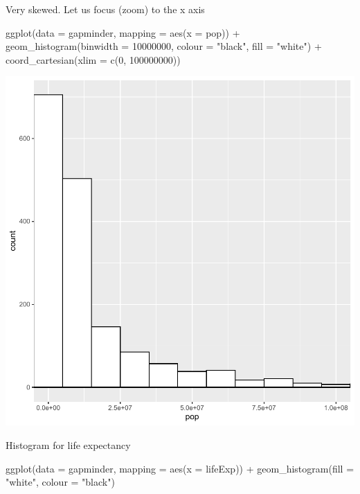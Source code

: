\documentclass[
]{book}
\makeatletter
\newenvironment{Shaded}{\begin{snugshade}}{\end{snugshade}}
\newcommand{\AttributeTok}[1]{\textcolor[rgb]{0.61,0.61,0.61}{#1}}
\newcommand{\DecValTok}[1]{\textcolor[rgb]{0.06,0.06,0.06}{#1}}
\newcommand{\FunctionTok}[1]{\textcolor[rgb]{0,0,0}{#1}}
\newcommand{\NormalTok}[1]{#1}
\newcommand{\SpecialCharTok}[1]{\textcolor[rgb]{0,0,0}{#1}}
\newcommand{\StringTok}[1]{\textcolor[rgb]{0.5,0.5,0.5}{#1}}
\newenvironment{kframe}{%
\medskip{}
\setlength{\fboxsep}{.8em}
 \def\at@end@of@kframe{}%
 \ifinner\ifhmode%
  \def\at@end@of@kframe{\end{minipage}}%
  \begin{minipage}{\columnwidth}%
 \fi\fi%
 \def\FrameCommand##1{\hskip\@totalleftmargin \hskip-\fboxsep
 \colorbox{shadecolor}{##1}\hskip-\fboxsep
     \hskip-\linewidth \hskip-\@totalleftmargin \hskip\columnwidth}%
 \MakeFramed {\advance\hsize-\width
   \@totalleftmargin\z@ \linewidth\hsize
   \@setminipage}}%
 {\par\unskip\endMakeFramed%
 \at@end@of@kframe}
\renewenvironment{Shaded}{\begin{kframe}}{\end{kframe}}
\makeatother
\begin{document}
Very skewed. Let us focus (zoom) to the x axis

\begin{Shaded}
\begin{Highlighting}[]
\FunctionTok{ggplot}\NormalTok{(}\AttributeTok{data =}\NormalTok{ gapminder, }\AttributeTok{mapping =} \FunctionTok{aes}\NormalTok{(}\AttributeTok{x =}\NormalTok{ pop)) }\SpecialCharTok{+} 
  \FunctionTok{geom\_histogram}\NormalTok{(}\AttributeTok{binwidth =} \DecValTok{10000000}\NormalTok{, }\AttributeTok{colour =} \StringTok{"black"}\NormalTok{, }\AttributeTok{fill =} \StringTok{"white"}\NormalTok{) }\SpecialCharTok{+}
  \FunctionTok{coord\_cartesian}\NormalTok{(}\AttributeTok{xlim =} \FunctionTok{c}\NormalTok{(}\DecValTok{0}\NormalTok{, }\DecValTok{100000000}\NormalTok{))}
\end{Highlighting}
\end{Shaded}

\begin{center}\includegraphics[width=0.7\linewidth,keepaspectratio]{Multivariable_Data_Analysis_files/figure-latex/unnamed-chunk-77-1} \end{center}

Histogram for life expectancy

\begin{Shaded}
\begin{Highlighting}[]
\FunctionTok{ggplot}\NormalTok{(}\AttributeTok{data =}\NormalTok{ gapminder, }\AttributeTok{mapping =} \FunctionTok{aes}\NormalTok{(}\AttributeTok{x =}\NormalTok{ lifeExp)) }\SpecialCharTok{+} 
  \FunctionTok{geom\_histogram}\NormalTok{(}\AttributeTok{fill =} \StringTok{"white"}\NormalTok{, }\AttributeTok{colour =} \StringTok{"black"}\NormalTok{)}
\end{Highlighting}
\end{Shaded}
\end{document}
